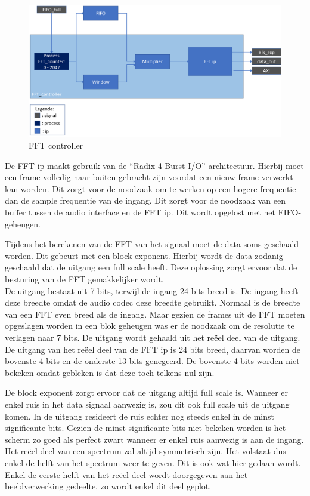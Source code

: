 \documentclass[a4paper,kul]{kulakarticle} %
\begin{document}
\begin{figure}[H]
	\centering
	\includegraphics[width=0.7\linewidth]{FFT_controller.png}
	\caption{FFT controller}
	\label{fig:fft_controller}
\end{figure}

De FFT ip maakt gebruik van de “Radix-4 Burst I/O” architectuur. Hierbij moet een frame volledig naar buiten gebracht zijn voordat een nieuw frame verwerkt kan worden. Dit zorgt voor de noodzaak om te werken op een hogere frequentie dan de sample frequentie van de ingang. Dit zorgt voor de noodzaak van een buffer tussen de audio interface en de FFT ip. Dit wordt opgelost met het FIFO-geheugen.

Tijdens het berekenen van de FFT van het signaal moet de data soms geschaald worden. Dit gebeurt met een block exponent. Hierbij wordt de data zodanig geschaald dat de uitgang een full scale heeft. Deze oplossing zorgt ervoor dat de besturing van de FFT gemakkelijker wordt.\\

De uitgang bestaat uit 7 bits, terwijl de ingang 24 bits breed is. De ingang heeft deze breedte omdat de audio codec deze breedte gebruikt. Normaal is de breedte van een FFT even breed als de ingang. Maar gezien de frames uit de FFT moeten opgeslagen worden in een blok geheugen was er de noodzaak om de resolutie te verlagen naar 7 bits. De uitgang wordt gehaald uit het reëel deel van de uitgang. De uitgang van het reëel deel van de FFT ip is 24 bits breed, daarvan worden de bovenste 4 bits en de onderste 13 bits genegeerd. De bovenste 4 bits worden niet bekeken omdat gebleken is dat deze toch telkens nul zijn.

De block exponent zorgt ervoor dat de uitgang altijd full scale is. Wanneer er enkel ruis in het data signaal aanwezig is, zou dit ook full scale uit de uitgang komen.  In de uitgang resideert de ruis echter nog steeds enkel in de minst significante bits. Gezien de minst significante bits niet bekeken worden is het scherm zo goed als perfect zwart wanneer er enkel ruis aanwezig is aan de ingang.
Het reëel deel van een spectrum zal altijd symmetrisch zijn. Het volstaat dus enkel de helft van het spectrum weer te geven. Dit is ook wat hier gedaan wordt. Enkel de eerste helft van het reëel deel wordt doorgegeven aan het beeldverwerking gedeelte, zo wordt enkel dit deel geplot.\\
\end{document}
